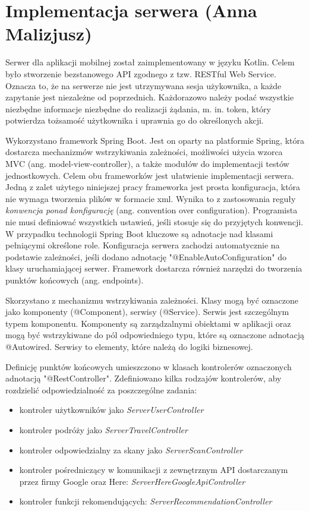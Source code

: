 \documentclass[10pt,twoside,a4paper]{report}
\begin{document}
\section{Implementacja serwera (Anna Malizjusz)}
\par Serwer dla aplikacji mobilnej został zaimplementowany w języku Kotlin. Celem było stworzenie bezstanowego API zgodnego z tzw. RESTful Web Service. Oznacza to, że na serwerze nie jest utrzymywana sesja użykownika, a każde zapytanie jest niezależne od poprzednich. Każdorazowo należy podać wszystkie niezbędne informacje niezbędne do realizacji żądania, m. in. token, który potwierdza tożsamość użytkownika i uprawnia go do określonych akcji.
\par Wykorzystano framework Spring Boot\cite{Spring documentation}. Jest on oparty na platformie Spring, która dostarcza mechanizmów wstrzykiwania zależności, możliwości użycia wzorca MVC (ang. model-view-controller), a także modułów do implementacji testów jednostkowych. Celem obu frameworków jest ułatwienie implementacji serwera. Jedną z zalet użytego niniejszej pracy frameworka jest prosta konfiguracja, która nie wymaga tworzenia plików w formacie xml. Wynika to z zastosowania reguły \textit{konwencja ponad konfigurację} (ang. convention over configuration). Programista nie musi definiować wszystkich ustawień, jeśli stosuje się do przyjętych konwencji. W przypadku technologii Spring Boot kluczowe są adnotacje nad klasami pełniącymi określone role. 
Konfiguracja serwera zachodzi automatycznie na podstawie zależności, jeśli dodano adnotację "@EnableAutoConfiguration" do klasy uruchamiającej serwer. Framework dostarcza również narzędzi do tworzenia punktów końcowych (ang. endpoints).

\par Skorzystano z mechanizmu wstrzykiwania zależności. Klasy mogą być oznaczone jako komponenty (@Component), serwisy (@Service). Serwis jest szczególnym typem komponentu. Komponenty są zarządzalnymi obiektami w aplikacji oraz mogą być wstrzykiwane do pól odpowiedniego typu, które są oznaczone adnotacją @Autowired. Serwisy to elementy, które należą do logiki biznesowej.
 
\par Definicję punktów końcowych umieszczono w klasach kontrolerów oznaczonych adnotacją "@RestController". Zdefiniowano kilka rodzajów kontrolerów, aby rozdzielić odpowiedzialność za poszczególne zadania:
\begin{itemize}
\item kontroler użytkowników jako \textit{ServerUserController}
\item kontroler podróży jako \textit{ServerTravelController}
\item kontroler odpowiedzialny za skany jako \textit{ServerScanController}
\item kontroler pośredniczący w komunikacji z zewnętrznym API dostarczanym przez firmy Google oraz Here: \textit{ServerHereGoogleApiController}
\item kontroler funkcji rekomendujących: \textit{ServerRecommendationController}
\end{itemize}
\end{document}

